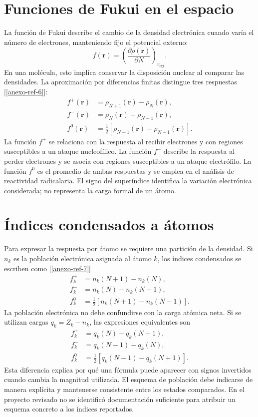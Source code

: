 \documentclass[12 pt, letter, oneside]{book}
\begin{document}
\section{Funciones de Fukui en el espacio}
La función de Fukui describe el cambio de la densidad electrónica cuando varía el número de electrones, manteniendo fijo el potencial externo:
\begin{equation}
 f(\mathbf r)=\left(\frac{\partial\rho(\mathbf r)}{\partial N}\right)_{v_{\mathrm{ext}}}.
\end{equation}
En una molécula, esto implica conservar la disposición nuclear al comparar las densidades. La aproximación por diferencias finitas distingue tres respuestas [\ref{anexo-ref-6}]:
\begin{align}
 f^+(\mathbf r)&=\rho_{N+1}(\mathbf r)-\rho_N(\mathbf r),\\
 f^-(\mathbf r)&=\rho_N(\mathbf r)-\rho_{N-1}(\mathbf r),\\
 f^0(\mathbf r)&=\tfrac12\left[\rho_{N+1}(\mathbf r)-\rho_{N-1}(\mathbf r)\right].
\end{align}
La función $f^+$ se relaciona con la respuesta al recibir electrones y con regiones susceptibles a un ataque nucleofílico. La función $f^-$ describe la respuesta al perder electrones y se asocia con regiones susceptibles a un ataque electrófilo. La función $f^0$ es el promedio de ambas respuestas y se emplea en el análisis de reactividad radicalaria. El signo del superíndice identifica la variación electrónica considerada; no representa la carga formal de un átomo.

\section{Índices condensados a átomos}
Para expresar la respuesta por átomo se requiere una partición de la densidad. Si $n_k$ es la población electrónica asignada al átomo $k$, los índices condensados se escriben como [\ref{anexo-ref-7}]
\begin{align}
 f_k^+&=n_k(N+1)-n_k(N),\\
 f_k^-&=n_k(N)-n_k(N-1),\\
 f_k^0&=\tfrac12[n_k(N+1)-n_k(N-1)].
\end{align}
La población electrónica no debe confundirse con la carga atómica neta. Si se utilizan cargas $q_k=Z_k-n_k$, las expresiones equivalentes son
\begin{align}
 f_k^+&=q_k(N)-q_k(N+1),\\
 f_k^-&=q_k(N-1)-q_k(N),\\
 f_k^0&=\tfrac12[q_k(N-1)-q_k(N+1)].
\end{align}
Esta diferencia explica por qué una fórmula puede aparecer con signos invertidos cuando cambia la magnitud utilizada. El esquema de población debe indicarse de manera explícita y mantenerse consistente entre los estados comparados. En el proyecto revisado no se identificó documentación suficiente para atribuir un esquema concreto a los índices reportados.
\end{document}
